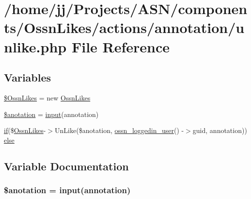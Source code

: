\hypertarget{annotation_2unlike_8php}{}\section{/home/jj/\+Projects/\+A\+S\+N/components/\+Ossn\+Likes/actions/annotation/unlike.php File Reference}
\label{annotation_2unlike_8php}
\subsection*{Variables}
\begin{DoxyCompactItemize}
\item 
\hyperlink{annotation_2unlike_8php_a227f36ff099a95468945a2fabc5c0782}{\$\+Ossn\+Likes} = new \hyperlink{class_ossn_likes}{Ossn\+Likes}
\item 
\hyperlink{annotation_2unlike_8php_af900958147bf7360167d1927035a1e9a}{\$anotation} = \hyperlink{ossn_8lib_8input_8php_a64ebee98b041c4f75f71ed3cd73cc8ed}{input}(\textquotesingle{}annotation\textquotesingle{})
\item 
\hyperlink{jquery_8tokeninput_8js_ad8dd46a3cbc004569e34401e9e71771a}{if}(\$\hyperlink{class_ossn_likes}{Ossn\+Likes}-\/$>$Un\+Like(\$anotation, \hyperlink{ossn_8lib_8users_8php_aa3c8068d0e6638b414d6a2f6c62565b8}{ossn\+\_\+loggedin\+\_\+user}() -\/$>$guid, \textquotesingle{}annotation\textquotesingle{})) \hyperlink{annotation_2unlike_8php_accf6dc8978a602e292ced6a3501735b5}{else}
\end{DoxyCompactItemize}


\subsection{Variable Documentation}
\subsubsection[{\texorpdfstring{\$anotation}{$anotation}}]{\setlength{\rightskip}{0pt plus 5cm}\$anotation = {\bf input}(\textquotesingle{}annotation\textquotesingle{})}\hypertarget{annotation_2unlike_8php_af900958147bf7360167d1927035a1e9a}{}\label{annotation_2unlike_8php_af900958147bf7360167d1927035a1e9a}


